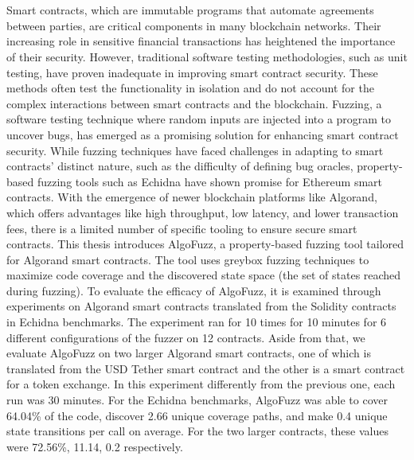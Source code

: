 \chapter{\abstractname}
Smart contracts, which are immutable programs that automate agreements between parties, are critical components in many blockchain networks. Their increasing role in sensitive financial transactions has heightened the importance of their security.
However, traditional software testing methodologies, such as unit testing, have proven inadequate in improving smart contract security.
These methods often test the functionality in isolation and do not account for the complex interactions between smart contracts and the blockchain.
Fuzzing, a software testing technique where random inputs are injected into a program to uncover bugs, has emerged as a promising solution for enhancing smart contract security.
While fuzzing techniques have faced challenges in adapting to smart contracts' distinct nature, such as the difficulty of defining bug oracles, property-based fuzzing tools such as Echidna have shown promise for Ethereum smart contracts.
With the emergence of newer blockchain platforms like Algorand, which offers advantages like high throughput, low latency, and lower transaction fees, there is a limited number of specific tooling to ensure secure smart contracts.
This thesis introduces AlgoFuzz, a property-based fuzzing tool tailored for Algorand smart contracts.
The tool uses greybox fuzzing techniques to maximize code coverage and the discovered state space (the set of states reached during fuzzing).
To evaluate the efficacy of AlgoFuzz, it is examined through experiments on Algorand smart contracts translated  from the Solidity contracts in Echidna benchmarks. The experiment ran for 10 times for 10 minutes for 6 different configurations of the fuzzer on 12 contracts.
Aside from that, we evaluate AlgoFuzz on two larger Algorand smart contracts, one of which is translated from the USD Tether smart contract and the other is a smart contract for a token exchange.
In this experiment differently from the previous one, each run was 30 minutes.
For the Echidna benchmarks, AlgoFuzz was able to cover 64.04\% of the code, discover 2.66 unique coverage paths, and make 0.4 unique state transitions per call on average. For the two larger contracts, these values were 72.56\%, 11.14, 0.2 respectively.

